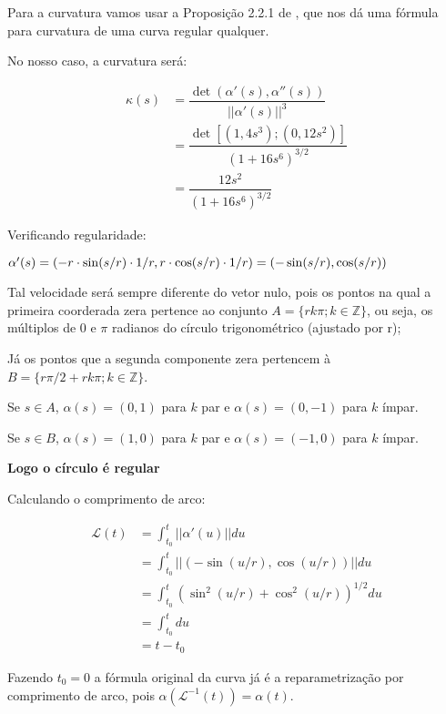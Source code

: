 \documentclass[12pt,letterpaper]{article}
\newcommand\lcur{\mathcal{L}}
\newcommand{\blue}[1]{{\color{blue}{#1}}}
\begin{document}
\begin{enumerate}
\begin{itemize}
		Para a curvatura vamos usar a Proposição 2.2.1 de \cite{pressley2001elementary}, que nos dá uma fórmula para curvatura de uma curva regular qualquer.
		
		
		No nosso caso, a curvatura será:
		 
		 \begin{align*}
		 	\kappa(s)&=\dfrac{\det(\alpha'(s),\alpha''(s))}{||\alpha'(s)||^3}\\
		 	&=\dfrac{\det[(1,4s^3);(0,12s^2)]}{(1+16s^6)^{3/2}}\\
		 	&=\dfrac{12s^2}{(1+16s^6)^{3/2}}
		 \end{align*}
	 		
	 
		\blue{
			\item (círculos) $\alpha(s)=(a+r\cdot\cos(s/r),b+r\cdot\sin(s/r)), s\in\mathbb{R},r>0;$}
		
		Verificando regularidade:
		
		$\alpha'(s)=(-r\cdot\sin(s/r)\cdot1/r,r\cdot\cos(s/r)\cdot1/r)\\=(-\sin(s/r),\cos(s/r))$
		
		Tal velocidade será sempre diferente do vetor nulo, pois os pontos na qual a primeira coorderada zera pertence ao conjunto $A=\{rk\pi;k\in\mathbb{Z}\}$, ou seja, os múltiplos de $0$ e $\pi$ radianos do círculo trigonométrico (ajustado por r);
		
		Já os pontos que a segunda componente zera pertencem à $B=\{r\pi/2+rk\pi;k\in\mathbb{Z}\}$.
		
		Se $s\in A$, $\alpha(s)=(0,1)$ para $k$ par e $\alpha(s)=(0,-1)$ para $k$ ímpar.
		
		Se $s\in B$, $\alpha(s)=(1,0)$ para $k$ par e $\alpha(s)=(-1,0)$ para $k$ ímpar.
		
		\textbf{Logo o círculo é regular}
		
		Calculando o comprimento de arco:
		
		\begin{align*}
			\lcur(t)&=\int_{t_0}^{t}||\alpha'(u)||du\\
			&=\int_{t_0}^{t}||(-\sin(u/r),\cos(u/r))||du\\
			&=\int_{t_0}^t(\sin^2(u/r)+\cos^2(u/r))^{1/2}du\\
			&=\int_{t_0}^tdu\\
			&=t-t_0
		\end{align*}
	
	Fazendo $t_0=0$ a fórmula original da curva já é a reparametrização por comprimento de arco, pois $\alpha(\lcur^{-1}(t))=\alpha(t)$.
	

\end{itemize}
\end{enumerate}
\end{document}
